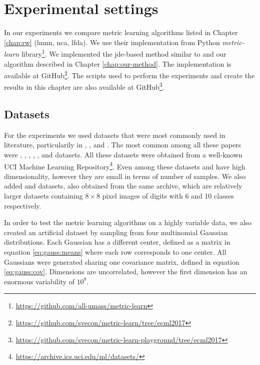 \documentclass[12pt,a4paper]{report}
\begin{document}
\section{Experimental settings} 
In our experiments we compare metric learning algorithms listed in Chapter \ref{chap:rw} (\ac{lmnn}, \ac{nca}, \ac{lfda}). We use their implementation from Python \textit{metric-learn} library\footnote{\url{https://github.com/all-umass/metric-learn}}. We implemented the \ac{jde}-based method similar to \cite{fukui2013evolutionary} and our algorithm described in Chapter \ref{chap:our-method}. The implementation is available at GitHub\footnote{\url{https://github.com/svecon/metric-learn/tree/ecml2017}}. The scripts used to perform the experiments and create the results in this chapter are also available at GitHub\footnote{\url{https://github.com/svecon/metric-learn-playground/tree/ecml2017}}.

\subsection{Datasets} \label{chap:exp:datasets}
For the experiments we used datasets that were most commonly used in literature, particularily in \cite{xing2002distance}, \cite{weinberger2009distance}, \cite{jacobgoldberger2004neighbourhood} and \cite{fukui2013evolutionary}. The most common among all these papers were , , , , ,  and  datasets. All these datasets were obtained from a well-known UCI Machine Learning Repository\footnote{\url{https://archive.ics.uci.edu/ml/datasets/}}. Even among these datasets  and  have high dimensionality, however they are small in terms of number of samples. We also added  and  datasets, also obtained from the same archive, which are relatively larger datasets containing $8\times 8$ pixel images of digits with 6 and 10 classes respectively.

In order to test the metric learning algorithms on a highly variable data, we also created an artificial dataset  by sampling from four multinomial Gaussian distributions. Each Gaussian has a different center, defined as a matrix in equation \eqref{eq:gauss:means} where each row corresponds to one center. All Gaussians were generated sharing one covariance matrix, defined in equation \eqref{eq:gauss:cov}. Dimensions are uncorrelated, however the first dimension has an enormous variability of $10^8$.
\end{document}
